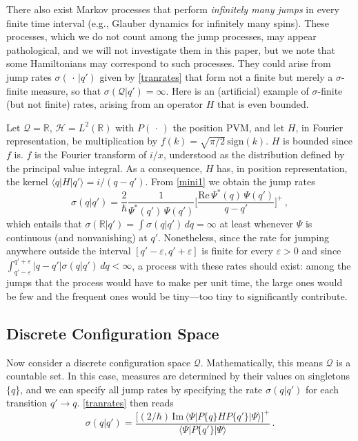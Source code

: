 \documentclass[12pt]{article}
\newcommand{\RRR}{\mathbb{R}} %
\newcommand{\I}{i} %
\newcommand{\1}{\mathbf{1}} %
\renewcommand{\Re}{\mathrm{Re}} %
\renewcommand{\Im}{\mathrm{Im}} %
\newcommand{\Hilbert}{\mathscr{H}}
\renewcommand{\sp}[2]{\langle #1 | #2 \rangle} %
\newcommand{\conf}{\mathcal{Q}} %
\newcommand{\pov}{{P}}%
\begin{document}
There also exist Markov processes that perform \emph{infinitely many
jumps} in every finite time interval (e.g., Glauber dynamics for
infinitely many spins). These processes, which we do not count among
the jump processes, may appear pathological, and we will not
investigate them in this paper, but we note that some Hamiltonians may
correspond to such processes. They could arise from jump rates
$\sigma(\,\cdot\,|q')$ given by \eqref{tranrates} that form not a
finite but merely a $\sigma$-finite measure, so that $\sigma(\conf|q')
= \infty$. Here is an (artificial) example of $\sigma$-finite (but not
finite)  rates,
arising from an operator $H$ that is even bounded.

Let $\conf = \RRR$, $\Hilbert = L^2(\RRR)$ with $\pov(\,\cdot\,)$ the
position PVM, and let  $H$, in Fourier representation, be
multiplication by $f(k) = \sqrt{\pi/2} \, \mathrm{sign}(k)$. $H$ is
bounded since $f$ is. $f$ is the Fourier transform of $\I/x$,
understood as the distribution defined by the principal value
integral.  As a consequence, $H$ has, in position representation, the
kernel $\sp{q}{H|q'} = \I/(q-q')$. {}From \eqref{mini1} we obtain the
jump rates
\begin{equation}\label{inftyrates}
   \sigma(q|q') = \frac{2}{\hbar} \frac{1}{\Psi^*(q') \, \Psi(q')}
   \Big[ \frac{\Re \, \Psi^*(q) \, \Psi(q')}{q-q'} \Big]^+ \,,
\end{equation}
which entails that $\sigma(\RRR|q') = \int \sigma(q|q') \, dq =
\infty$ at least whenever $\Psi$ is continuous (and nonvanishing) at
$q'$. Nonetheless, since the rate for jumping anywhere outside the
interval $[q' - \varepsilon, q' + \varepsilon]$ is finite for every
$\varepsilon >0$ and since $\int_{q'- \varepsilon}^{q' + \varepsilon}
|q-q'|\sigma(q|q') \, dq < \infty$, a process with these rates should
exist: among the jumps that the process would have to make per unit
time, the large ones would be few and the frequent ones would be
tiny---too tiny to significantly contribute.



\subsection{Discrete Configuration Space}
\label{sec:discrete}

Now consider a discrete configuration space $\conf$. Mathematically,
this means $\conf$ is a countable set. In this case, measures are
determined by their values on singletons $\{q\}$, and we can specify
all jump rates by specifying the rate $\sigma(q|q')$ for each
transition $q' \to q$. \eqref{tranrates} then reads
\begin{equation}\label{disrates2}
   \sigma(q|q') = \frac{\big[ (2/\hbar) \, \Im \, \sp{\Psi} {\pov\{q\}
   H \pov\{q'\}| \Psi} \big]^+} {\sp{\Psi}{\pov\{q'\}| \Psi}} \,.
\end{equation}
\end{document}
